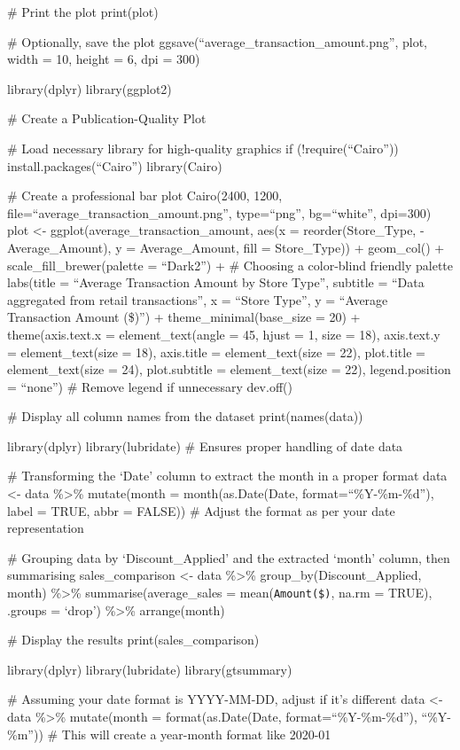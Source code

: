 \documentclass[
]{article}
\begin{document}
\# Print the plot print(plot)

\# Optionally, save the plot
ggsave(``average\_transaction\_amount.png'', plot, width = 10, height =
6, dpi = 300)

library(dplyr) library(ggplot2)

\# Create a Publication-Quality Plot

\# Load necessary library for high-quality graphics if
(!require(``Cairo'')) install.packages(``Cairo'') library(Cairo)

\# Create a professional bar plot Cairo(2400, 1200,
file=``average\_transaction\_amount.png'', type=``png'', bg=``white'',
dpi=300) plot \textless- ggplot(average\_transaction\_amount, aes(x =
reorder(Store\_Type, -Average\_Amount), y = Average\_Amount, fill =
Store\_Type)) + geom\_col() + scale\_fill\_brewer(palette = ``Dark2'') +
\# Choosing a color-blind friendly palette labs(title = ``Average
Transaction Amount by Store Type'', subtitle = ``Data aggregated from
retail transactions'', x = ``Store Type'', y = ``Average Transaction
Amount (\$)'') + theme\_minimal(base\_size = 20) + theme(axis.text.x =
element\_text(angle = 45, hjust = 1, size = 18), axis.text.y =
element\_text(size = 18), axis.title = element\_text(size = 22),
plot.title = element\_text(size = 24), plot.subtitle =
element\_text(size = 22), legend.position = ``none'') \# Remove legend
if unnecessary dev.off()

\# Display all column names from the dataset print(names(data))

library(dplyr) library(lubridate) \# Ensures proper handling of date
data

\# Transforming the `Date' column to extract the month in a proper
format data \textless- data \%\textgreater\% mutate(month =
month(as.Date(Date, format=``\%Y-\%m-\%d''), label = TRUE, abbr =
FALSE)) \# Adjust the format as per your date representation

\# Grouping data by `Discount\_Applied' and the extracted `month'
column, then summarising sales\_comparison \textless- data
\%\textgreater\% group\_by(Discount\_Applied, month) \%\textgreater\%
summarise(average\_sales = mean(\texttt{Amount(\$)}, na.rm = TRUE),
.groups = `drop') \%\textgreater\% arrange(month)

\# Display the results print(sales\_comparison)

library(dplyr) library(lubridate) library(gtsummary)

\# Assuming your date format is YYYY-MM-DD, adjust if it's different
data \textless- data \%\textgreater\% mutate(month =
format(as.Date(Date, format=``\%Y-\%m-\%d''), ``\%Y-\%m'')) \# This will
create a year-month format like 2020-01
\end{document}

